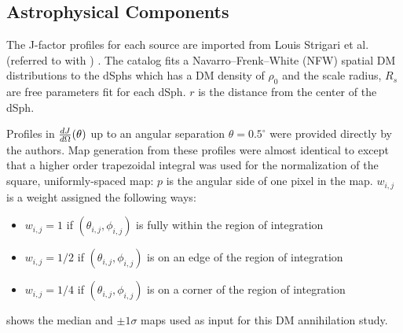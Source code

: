 \subsection{\J Astrophysical Components}\label{sec:mtd_spatialmodel}

The J-factor profiles for each source are imported from Louis Strigari et al. (referred to with \LS) \cite{DM_Strigari20}.
The \LS catalog fits a Navarro–Frenk–White (NFW) \cite{NFWProfile} spatial DM distributions to the dSphs which has a DM density of
\nfwProfile
$\rho_0$ and the scale radius, $R_s$ are free parameters fit for each dSph.
$r$ is the distance from the center of the dSph.

Profiles in $\frac{dJ}{d\Omega} (\theta)$ up to an angular separation $\theta = 0.5^{\circ}$ were provided directly by the authors.
Map generation from these profiles were almost identical to  except that a higher order trapezoidal integral was used for the normalization of the square, uniformly-spaced map:
\TrapIntegral
$p$ is the angular side of one pixel in the map.
$w_{i,j}$ is a weight assigned the following ways:
\begin{itemize}
    \item[] $w_{i,j} = 1$ if $(\theta_{i,j}, \phi_{i,j})$ is fully within the region of integration
    \item[] $w_{i,j} = 1/2$ if $(\theta_{i,j}, \phi_{i,j})$ is on an edge of the region of integration
    \item[] $w_{i,j} = 1/4$ if $(\theta_{i,j}, \phi_{i,j})$ is on a corner of the region of integration
\end{itemize}
 shows the median and $\pm1\sigma$ maps used as input for this DM annihilation study.

